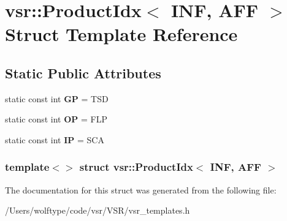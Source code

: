 \hypertarget{structvsr_1_1_product_idx_3_01_i_n_f_00_01_a_f_f_01_4}{\section{vsr\-:\-:Product\-Idx$<$ I\-N\-F, A\-F\-F $>$ Struct Template Reference}
\label{structvsr_1_1_product_idx_3_01_i_n_f_00_01_a_f_f_01_4}
}
\subsection*{Static Public Attributes}
\begin{DoxyCompactItemize}
\item 
\hypertarget{structvsr_1_1_product_idx_3_01_i_n_f_00_01_a_f_f_01_4_a4316ef996b54af57136156ffa40ddaec}{static const int {\bfseries G\-P} = T\-S\-D}\label{structvsr_1_1_product_idx_3_01_i_n_f_00_01_a_f_f_01_4_a4316ef996b54af57136156ffa40ddaec}

\item 
\hypertarget{structvsr_1_1_product_idx_3_01_i_n_f_00_01_a_f_f_01_4_a64c1680d848ba353ae7dcdcc2e5b9d50}{static const int {\bfseries O\-P} = F\-L\-P}\label{structvsr_1_1_product_idx_3_01_i_n_f_00_01_a_f_f_01_4_a64c1680d848ba353ae7dcdcc2e5b9d50}

\item 
\hypertarget{structvsr_1_1_product_idx_3_01_i_n_f_00_01_a_f_f_01_4_ad960871d2450d5ac9133a0fa357decd0}{static const int {\bfseries I\-P} = S\-C\-A}\label{structvsr_1_1_product_idx_3_01_i_n_f_00_01_a_f_f_01_4_ad960871d2450d5ac9133a0fa357decd0}

\end{DoxyCompactItemize}
\subsubsection*{template$<$$>$ struct vsr\-::\-Product\-Idx$<$ I\-N\-F, A\-F\-F $>$}



The documentation for this struct was generated from the following file\-:\begin{DoxyCompactItemize}
\item 
/\-Users/wolftype/code/vsr/\-V\-S\-R/vsr\-\_\-templates.\-h\end{DoxyCompactItemize}
